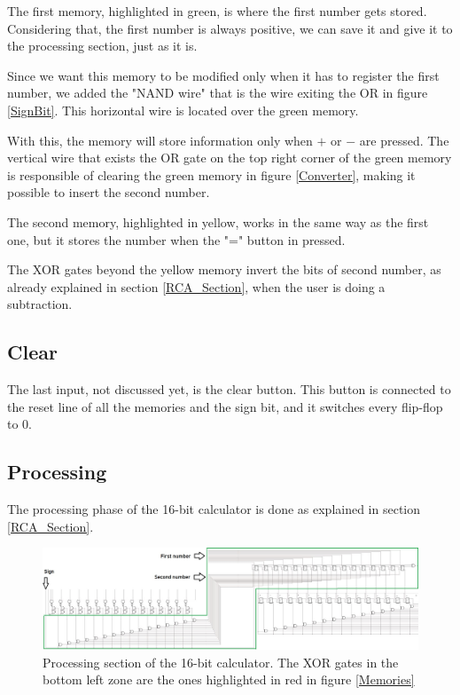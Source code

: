 \documentclass{article}
\begin{document}
\vspace{3mm}

The first memory, highlighted in green, is where the first number gets stored. Considering that, the first number is always positive, we can save it and give it to the processing section, just as it is. 

\vspace{3mm}

Since we want this memory to be modified only when it has to register the first number, we added the "NAND wire" that is the wire exiting the OR in figure \ref{SignBit}. This horizontal wire is located over the green memory.

\vspace{3mm}

With this, the memory will store information only when $+$ or $-$ are pressed. The vertical wire that exists the OR gate on the top right corner of the green memory is responsible of clearing the green memory in figure \ref{Converter}, making it possible to insert the second number.

\vspace{3mm}

The second memory, highlighted in yellow, works in the same way as the first one, but it stores the number when the "=" button in pressed.

\vspace{3mm}

The XOR gates beyond the yellow memory invert the bits of second number, as already explained in section \ref{RCA_Section}, when the user is doing a subtraction.

\subsection{Clear}

The last input, not discussed yet, is the clear button. This button is connected to the reset line of all the memories and the sign bit, and it switches every flip-flop to 0. 

\subsection{Processing}

The processing phase of the 16-bit calculator is done as explained in section \ref{RCA_Section}.

\begin{figure}[h]
  \centering
  \includegraphics[scale=.4]{SC_Processing_Total.JPG}
  \caption{Processing section of the 16-bit calculator. The XOR gates in the bottom left zone are the ones highlighted in red in figure \ref{Memories} }
  \label{ProcessingTotal}
\end{figure}
\end{document}
